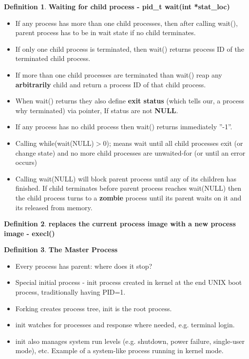 \documentclass[12pt,a4paper]{article}
\theoremstyle{definition}
\newtheorem{definition}{Definition}[section]
\newenvironment{myitemize}
{ \begin{itemize}
    \setlength{\itemsep}{5pt}
    \setlength{\parskip}{0pt}
    \setlength{\parsep}{0pt}     }
{ \end{itemize}                  }
\begin{document}
\begin{definition}{\textbf{Waiting for child process - \textsf{pid\_t wait(int *stat\_loc)}}}
	\begin{myitemize}
		\item If any process has more than one child processes, then after calling \textsf{wait()}, parent process has to be in wait state if no child terminates.
		\item If only one child process is terminated, then \textsf{wait()} returns process ID of the terminated child process.
		\item If more than one child processes are terminated than \textsf{wait()} reap any \textbf{arbitrarily} child and return a process ID of that child process.
		\item When \textsf{wait()} returns they also define \textbf{exit status} (which tells our, a process why terminated) via pointer, If status are not \textbf{NULL}.
		\item If any process has no child process then \textsf{wait()} returns immediately ''-1''.
		\item Calling \textsf{while(wait(NULL)$>$0);} means wait until all child processes exit (or change state) and no more child processes are unwaited-for (or until an error occurs)
		\item Calling \textsf{wait(NULL)} will block parent process until any of its children has finished. If child terminates before parent process reaches \textsf{wait(NULL)} then the child process turns to a \textbf{zombie} process until its parent waits on it and its released from memory.
	\end{myitemize}
\end{definition}

\begin{definition}{\textbf{replaces the current process image with a new process image - \textsf{execl()}}}
	
\end{definition}

\begin{definition}{\textbf{The Master Process}}
	\begin{myitemize}
		\item Every process has parent: \textsf{where does it stop?}
		\item Special initial process - \textsf{init} process created in kernel at the end UNIX boot process, traditionally having PID=1.
		\item Forking creates process tree, \textsf{init} is the root process.
		\item \textsf{init} watches for processes and response where needed, e.g. terminal login.
		\item \textsf{init} also manages system run levels (e.g. shutdown, power failure, single-user mode), etc. Example of a system-like process running in kernel mode.
	\end{myitemize}
\end{definition}
\end{document}
